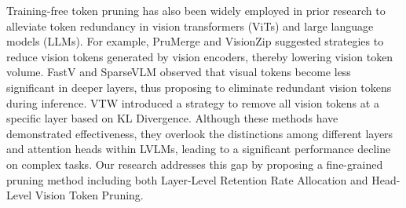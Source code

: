 Training-free token pruning has also been widely employed in prior research to alleviate token redundancy in vision transformers (ViTs) and large language models (LLMs). For example, PruMerge \cite{shang2024llava} and VisionZip \cite{yang2024visionzip} suggested strategies to reduce vision tokens generated by vision encoders, thereby lowering vision token volume. FastV \cite{chen2024image} and SparseVLM \cite{zhang2024sparsevlm} observed that visual tokens become less significant in deeper layers, thus proposing to eliminate redundant vision tokens during inference. VTW \cite{lin2024boosting} introduced a strategy to remove all vision tokens at a specific layer based on KL Divergence. Although these methods have demonstrated effectiveness, they overlook the distinctions among different layers and attention heads within LVLMs, leading to a significant performance decline on complex tasks. Our research addresses this gap by proposing a fine-grained pruning method including both Layer-Level Retention Rate Allocation and Head-Level Vision Token Pruning.